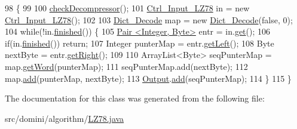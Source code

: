 \begin{DoxyCode}
98                                \{
99 
100         \hyperlink{classdomini_1_1algorithm_1_1Algorithm_a6b738342cc7169893fa60d593f5a13db}{checkDecompressor}();
101         \hyperlink{classpersistencia_1_1input_1_1Ctrl__Input__LZ78}{Ctrl\_Input\_LZ78} in = \textcolor{keyword}{new} \hyperlink{classpersistencia_1_1input_1_1Ctrl__Input__LZ78}{Ctrl\_Input\_LZ78}();
102 
103         \hyperlink{classdomini_1_1utils_1_1Dict__Decode}{Dict\_Decode} map = \textcolor{keyword}{new} \hyperlink{classdomini_1_1utils_1_1Dict__Decode}{Dict\_Decode}(\textcolor{keyword}{false}, 0);
104         \textcolor{keywordflow}{while}(!in.\hyperlink{classpersistencia_1_1input_1_1Ctrl__Input_a5a94d207dce0fd592b5ac17f55154d4f}{finished}()) \{
105             \hyperlink{classdomini_1_1utils_1_1Pair}{Pair <Integer, Byte>} entr = in.\hyperlink{classpersistencia_1_1input_1_1Ctrl__Input__LZ78_ae09535962f284be3a76369845c15b78c}{get}();
106             \textcolor{keywordflow}{if}(in.\hyperlink{classpersistencia_1_1input_1_1Ctrl__Input_a5a94d207dce0fd592b5ac17f55154d4f}{finished}()) \textcolor{keywordflow}{return};
107             Integer punterMap = entr.\hyperlink{classdomini_1_1utils_1_1Pair_a9439fbd8488cb1fbf00c57f15f093c4b}{getLeft}();
108             Byte nextByte = entr.\hyperlink{classdomini_1_1utils_1_1Pair_a0dca94eb1a43952258bebe1dca4c84e9}{getRight}();
109 
110             ArrayList<Byte> seqPunterMap = map.\hyperlink{classdomini_1_1utils_1_1Dict__Decode_a0f6457460aefe9df50f0cad48f58feee}{getWord}(punterMap);
111             seqPunterMap.add(nextByte);
112             map.\hyperlink{classdomini_1_1utils_1_1Dict__Decode_a077011e4507db308d143ea9b7146abb9}{add}(punterMap, nextByte);
113             \hyperlink{classdomini_1_1algorithm_1_1Algorithm_a4de9955411c656325adc391ef570c082}{Output}.\hyperlink{classpersistencia_1_1output_1_1Ctrl__Output_a8c5aa5a6acb5259faeb1c05c71ddd21c}{add}(seqPunterMap);
114         \}
115     \}
\end{DoxyCode}


The documentation for this class was generated from the following file\+:\begin{DoxyCompactItemize}
\item 
src/domini/algorithm/\hyperlink{LZ78_8java}{L\+Z78.\+java}\end{DoxyCompactItemize}
